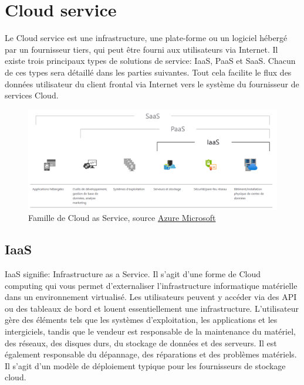 \documentclass[pfe]{tnreport} %
\begin{document}
\section{Cloud service}

Le  Cloud service est une infrastructure, une plate-forme ou un logiciel hébergé par un fournisseur tiers, qui peut être fourni aux utilisateurs via Internet. Il existe trois principaux types de solutions de service: IaaS, PaaS et SaaS. Chacun de ces types sera détaillé dans les parties suivantes. \newline
Tout cela facilite le flux des données utilisateur du client frontal via Internet vers le système du fournisseur de services Cloud.

\begin{figure}[h]
  \centering
  \includegraphics[width=18cm]{figures/what-is-iaas.png}
  \caption{Famille de Cloud as Service, source 
  \href{https://azure.microsoft.com/fr-fr/overview/what-is-iaas/}{Azure Microsoft}}
  \label{fig:famille}
\end{figure}

\subsection{IaaS}

IaaS signifie: Infrastructure as a Service. Il s'agit d'une forme de Cloud computing qui vous permet d'externaliser l'infrastructure informatique matérielle dans un environnement virtualisé.
Les utilisateurs peuvent y accéder via des API ou des tableaux de bord et louent essentiellement une infrastructure. L'utilisateur gère des éléments tels que les systèmes d'exploitation, les applications et les intergiciels, tandis que le vendeur est responsable de la maintenance du matériel, des réseaux, des disques durs, du stockage de données et des serveurs. \newline
Il est également responsable du dépannage, des réparations et des problèmes matériels. Il s'agit d'un modèle de déploiement typique pour les fournisseurs de stockage cloud.
\end{document}
